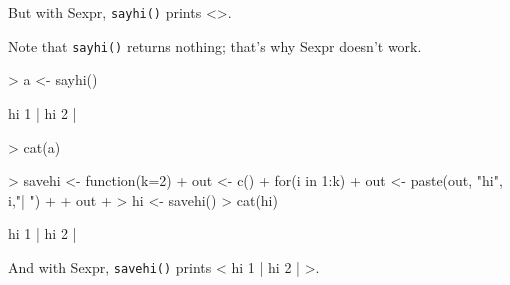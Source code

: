 \documentclass[a4paper]{report}
\begin{document}
But with Sexpr, {\tt sayhi()} prints <>.

Note that {\tt sayhi()} returns nothing; that's why Sexpr doesn't work.

\begin{Schunk}
\begin{Sinput}
> a <- sayhi()
\end{Sinput}
\begin{Soutput}
hi 1 | hi 2 | 
\end{Soutput}
\begin{Sinput}
> cat(a)
\end{Sinput}
\end{Schunk}

\begin{Schunk}
\begin{Sinput}
> savehi <- function(k=2) {
+   out <- c()
+   for(i in 1:k) {
+     out <- paste(out, "hi", i,"| ")
+   }
+   out
+ }
> hi <- savehi()
> cat(hi)
\end{Sinput}
\begin{Soutput}
 hi 1 |  hi 2 | 
\end{Soutput}
\end{Schunk}

And with Sexpr, {\tt savehi()} prints < hi 1 |  hi 2 | >.



\end{document}
